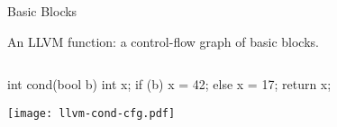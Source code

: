 \documentclass{plt}
\begin{document}
\begin{frame}[fragile=singleslide]{Basic Blocks}

An LLVM function: a control-flow graph of basic blocks.

\begin{columns}
\begin{column}{0.45\textwidth}
\begin{C}
int cond(bool b) {
  int x;
  if (b) x = 42;
  else   x = 17;
  return x;
}
\end{C}

\texttt{[image: llvm-cond-cfg.pdf]}
\end{column}
\begin{column}{0.55\textwidth}
\end{column}
\end{columns}
\end{frame}
\end{document}
